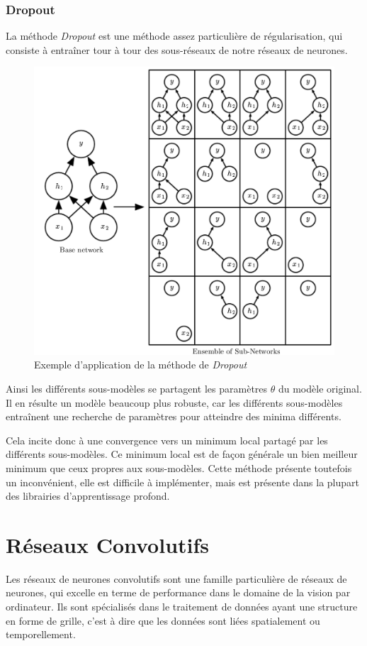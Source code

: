 \documentclass[a4paper, 11pt]{report}
\begin{document}
\subsubsection{Dropout}
La méthode \emph{Dropout} \citep{Srivastava2014} est une méthode assez particulière de régularisation, qui consiste à entraîner tour à tour des sous-réseaux de notre réseaux de neurones.
\begin{figure}[H]
	\centering
	\includegraphics[scale=0.20]{Images/Dropout.png}
	\caption{Exemple d'application de la méthode de \emph{Dropout}}
\end{figure}
Ainsi les différents sous-modèles se partagent les paramètres $\theta$ du modèle original.
Il en résulte un modèle beaucoup plus robuste, car les différents sous-modèles entraînent une recherche de paramètres pour atteindre des minima différents.

Cela incite donc à une convergence vers un minimum local partagé par les différents sous-modèles.
Ce minimum local est de façon générale un bien meilleur minimum que ceux propres aux sous-modèles.
Cette méthode présente toutefois un inconvénient, elle est difficile à implémenter, mais est présente dans la plupart des librairies d'apprentissage profond.
\section{Réseaux Convolutifs}
Les réseaux de neurones convolutifs \citep{Krizhevsky2012} sont une famille particulière de réseaux de neurones, qui excelle en terme de performance dans le domaine de la vision par ordinateur.
Ils sont spécialisés dans le traitement de données ayant une structure en forme de grille, c'est à dire que les données sont liées spatialement ou temporellement.
\end{document}
